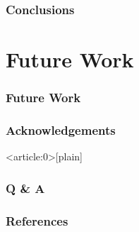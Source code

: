 \documentclass[aspectratio=169]{beamer}
\begin{document}
\begin{frame}
  \frametitle{Conclusions}
\end{frame}

\section{Future Work}

\begin{frame}
  \frametitle{Future Work}
\end{frame}

\begin{frame}
  \frametitle{Acknowledgements}
\end{frame}



{ %
    \begin{frame}<article:0>[plain]
      \frametitle{Q \& A}
     \end{frame}
}

\begin{frame}
  \cite{Burgess2012}    
  \cite{Caggiani2014}
  \cite{Carvalho2019AdaptationSystems}
  \cite{Schaffer-Smith2018NetworkTrade}
\end{frame}


\begin{frame}[allowframebreaks]
  \frametitle{References}
  \tiny 
  
\end{frame}
\end{document}
